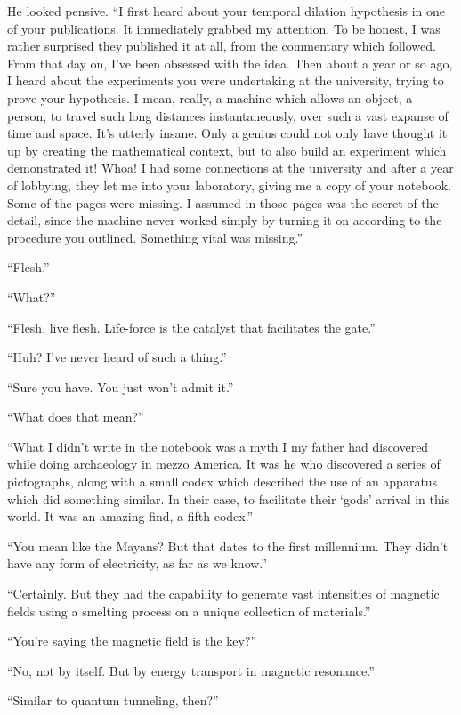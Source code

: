 He looked pensive. ``I first heard about your temporal dilation
hypothesis in one of your publications. It immediately grabbed my
attention. To be honest, I was rather surprised they published it at
all, from the commentary which followed. From that day on, I've been
obsessed with the idea. Then about a year or so ago, I heard about the
experiments you were undertaking at the university, trying to prove your
hypothesis. I mean, really, a machine which allows an object, a person,
to travel such long distances instantaneously, over such a vast expanse
of time and space. It's utterly insane. Only a genius could not only
have thought it up by creating the mathematical context, but to also
build an experiment which demonstrated it! Whoa! I had some connections
at the university and after a year of lobbying, they let me into your
laboratory, giving me a copy of your notebook. Some of the pages were
missing. I assumed in those pages was the secret of the detail, since
the machine never worked simply by turning it on according to the
procedure you outlined. Something vital was missing.''

``Flesh.''

``What?''

``Flesh, live flesh. Life-force is the catalyst that facilitates the
gate.''

``Huh? I've never heard of such a thing.''

``Sure you have. You just won't admit it.''

``What does that mean?''

``What I didn't write in the notebook was a myth I my father had
discovered while doing archaeology in mezzo America. It was he who
discovered a series of pictographs, along with a small codex which
described the use of an apparatus which did something similar. In their
case, to facilitate their `gods' arrival in this world. It was an
amazing find, a fifth codex.''

``You mean like the Mayans? But that dates to the first millennium. They
didn't have any form of electricity, as far as we know.''

``Certainly. But they had the capability to generate vast intensities of
magnetic fields using a smelting process on a unique collection of
materials.''

``You're saying the magnetic field is the key?''

``No, not by itself. But by energy transport in magnetic resonance.''

``Similar to quantum tunneling, then?''

